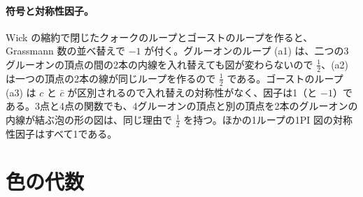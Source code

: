 \documentclass[a4paper,10pt]{ltjsarticle}
\begin{document}
\paragraph{符号と対称性因子。}Wick の縮約で閉じたクォークのループとゴーストのループを作ると、Grassmann 数の並べ替えで $-1$ が付く。グルーオンのループ (a1) は、二つの3グルーオンの頂点の間の2本の内線を入れ替えても図が変わらないので $\frac12$、(a2) は一つの頂点の2本の線が同じループを作るので $\frac12$ である。ゴーストのループ (a3) は $c$ と $\bar c$ が区別されるので入れ替えの対称性がなく、因子は1（と $-1$）である。3点と4点の関数でも、4グルーオンの頂点と別の頂点を2本のグルーオンの内線が結ぶ泡の形の図は、同じ理由で $\frac12$ を持つ。ほかの1ループの1PI 図の対称性因子はすべて1である。

\section{色の代数}\label{app:color}
\end{document}
